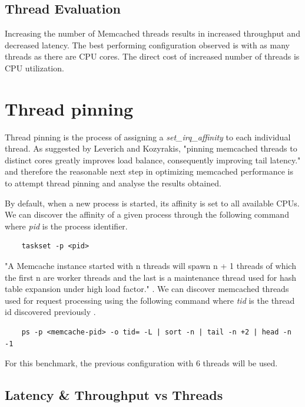 \subsection{Thread Evaluation}
Increasing the number of Memcached threads results in increased throughput and decreased latency. The best performing configuration observed is with as many threads as there are CPU cores. The direct cost of increased number of threads is CPU utilization.


\section{Thread pinning}
\label{sec:thread-pinning}
Thread pinning is the process of assigning a \textit{set\_irq\_affinity} to each individual thread. As suggested by Leverich and Kozyrakis, "pinning memcached threads to distinct cores greatly improves load balance, consequently improving tail latency." \cite{leverich2014reconciling} and therefore the reasonable next step in optimizing memcached performance is to attempt thread pinning and analyse the results obtained.

By default, when a new process is started, its affinity is set to all available CPUs. We can discover the affinity of a given process through the following command where \textit{pid} is the process identifier.

\begin{lstlisting}
    taskset -p <pid>
\end{lstlisting}


"A Memcache instance started with n threads will spawn n + 1 threads of which the first n are worker threads and the last is a maintenance thread used for hash table expansion under high load factor." \cite{solarflarememcached}. We can discover memcached threads used for request processing using the following command where \textit{tid} is the thread id discovered previously \cite{solarflarememcached}.
\begin{lstlisting}
    ps -p <memcache-pid> -o tid= -L | sort -n | tail -n +2 | head -n -1
\end{lstlisting}

For this benchmark, the previous configuration with 6 threads will be used.

\subsection{Latency \& Throughput vs Threads}

